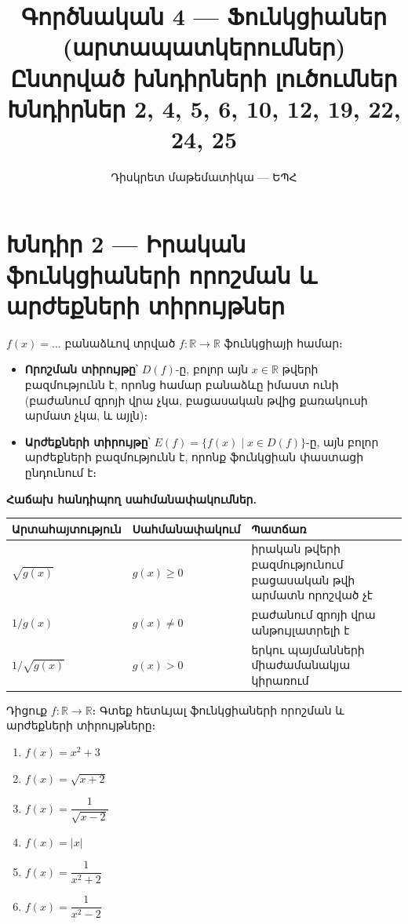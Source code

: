 \documentclass[12pt, a4paper]{article}
\title{\textbf{Գործնական 4 — Ֆունկցիաներ (արտապատկերումներ)}\\[4pt]
       \large Ընտրված խնդիրների լուծումներ\\[2pt]
       \normalsize Խնդիրներ 2, 4, 5, 6, 10, 12, 19, 22, 24, 25}
\author{Դիսկրետ մաթեմատիկա — ԵՊՀ}
\date{}
\newcommand{\R}{\mathbb{R}}
\begin{document}
\maketitle
\tableofcontents
\newpage

\section{Խնդիր 2 — Իրական ֆունկցիաների որոշման և արժեքների տիրույթներ}

\begin{theorybox}
$f(x) = \ldots$ բանաձևով տրված $f : \R \to \R$ ֆունկցիայի համար։
\begin{itemize}[nosep]
  \item \textbf{Որոշման տիրույթը}՝ $D(f)$-ը, բոլոր այն $x \in \R$ թվերի բազմությունն է,
        որոնց համար բանաձևը իմաստ ունի (բաժանում զրոյի վրա չկա, բացասական թվից քառակուսի արմատ չկա, և այլն)։
  \item \textbf{Արժեքների տիրույթը}՝ $E(f) = \{f(x) \mid x \in D(f)\}$-ը, 
        այն բոլոր արժեքների բազմությունն է, որոնք ֆունկցիան փաստացի ընդունում է։
\end{itemize}

\medskip
\textbf{Հաճախ հանդիպող սահմանափակումներ.}
\begin{center}
\renewcommand{\arraystretch}{1.3}
\begin{tabular}{lll}
\toprule
\textbf{Արտահայտություն} & \textbf{Սահմանափակում} & \textbf{Պատճառ} \\
\midrule
$\sqrt{g(x)}$ & $g(x) \ge 0$ & իրական թվերի բազմությունում բացասական թվի արմատն որոշված չէ \\
$1/g(x)$ & $g(x) \neq 0$ & բաժանում զրոյի վրա անթույլատրելի է \\
$1/\sqrt{g(x)}$ & $g(x) > 0$ & երկու պայմանների միաժամանակյա կիրառում \\
\bottomrule
\end{tabular}
\end{center}
\end{theorybox}

\begin{problembox}
Դիցուք $f : \R \to \R$։ Գտեք հետևյալ ֆունկցիաների որոշման և արժեքների տիրույթները։
\begin{enumerate}[label=(\alph*), nosep]
  \item $f(x) = x^2 + 3$
  \item $f(x) = \sqrt{x+2}$
  \item $f(x) = \dfrac{1}{\sqrt{x-2}}$
  \item $f(x) = |x|$
  \item $f(x) = \dfrac{1}{x^2+2}$
  \item $f(x) = \dfrac{1}{x^2-2}$
\end{enumerate}
\end{problembox}
\end{document}
